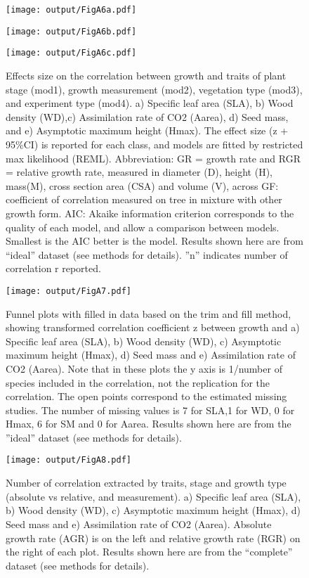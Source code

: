 \documentclass[a4paper,11pt]{article}
\begin{document}
\begin{appendices}
\begin{figure}[h!]
\centering
\texttt{[image: output/FigA6a.pdf]}
\end{figure}

\begin{figure}[h!]
\centering
\texttt{[image: output/FigA6b.pdf]}
\end{figure}

\begin{figure}[h!]
\centering
\texttt{[image: output/FigA6c.pdf]}
\caption{Effects size on the correlation between growth and traits of plant stage (mod1), growth measurement (mod2), vegetation type (mod3),  and experiment type (mod4). a) Specific leaf area (SLA), b) Wood density (WD),c) Assimilation rate of CO2 (Aarea), d) Seed mass, and e) Asymptotic maximum height (Hmax). The effect size (z + 95\%CI) is reported for each class, and models are fitted by restricted max likelihood (REML). Abbreviation: GR = growth rate and RGR = relative growth rate, measured in diameter (D), height (H), mass(M), cross section area (CSA) and volume (V), across GF: coefficient of correlation measured on tree in mixture with other growth form. AIC: Akaike information criterion corresponds to the quality of each model, and allow a comparison between models. Smallest is the AIC better is the model. Results shown here are from ``ideal'' dataset (see methods for details). ''n'' indicates number of correlation r reported.}
\label{fig:figA6}
\end{figure}

\begin{figure}[h!]
\centering
\texttt{[image: output/FigA7.pdf]}
\caption{Funnel plots with filled in data based on the trim and fill method, showing transformed correlation coefficient z between growth and a) Specific leaf area (SLA), b) Wood density (WD), c) Asymptotic maximum height (Hmax), d) Seed mass and e) Assimilation rate of CO2 (Aarea). Note that in these plots the y axis is 1/number of species included in the correlation, not the replication for the correlation. The open points correspond to the estimated missing studies. The number of missing values is 7 for SLA,1 for WD, 0 for Hmax, 6 for SM and 0 for Aarea. Results shown here are from the ''ideal'' dataset (see methods for details).}
\label{fig:figA7}
\end{figure}

\begin{figure}[h!]
\centering
\texttt{[image: output/FigA8.pdf]}
\caption{Number of correlation extracted by traits, stage and growth type (absolute vs relative, and measurement). a) Specific leaf area (SLA), b) Wood density (WD), c) Asymptotic maximum height (Hmax), d) Seed mass and e) Assimilation rate of CO2 (Aarea). Absolute growth rate (AGR) is on the left and relative growth rate (RGR) on the right of each plot. Results shown here are from the ``complete'' dataset (see methods for details). }
\label{fig:figA8}
\end{figure}


\end{appendices}
\end{document}
